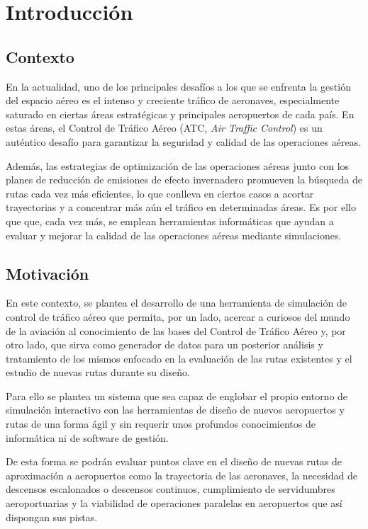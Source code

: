 \chapter{Introducción}
\label{sec:intro}


\section{Contexto}
\label{sec:contexto}

En la actualidad, uno de los principales desafíos a los que se enfrenta la gestión del espacio aéreo es el intenso y creciente tráfico de aeronaves, especialmente saturado en ciertas áreas estratégicas y principales aeropuertos de cada país. En estas áreas, el Control de Tráfico Aéreo (ATC, \textit{Air Traffic Control}) es un auténtico desafío para garantizar la seguridad y calidad de las operaciones aéreas.

Además, las estrategias de optimización de las operaciones aéreas junto con los planes de reducción de emisiones de efecto invernadero promueven la búsqueda de rutas cada vez más eficientes, lo que conlleva en ciertos casos a acortar trayectorias y a concentrar más aún el tráfico en determinadas áreas. Es por ello que que, cada vez más, se emplean herramientas informáticas que ayudan a evaluar y mejorar la calidad de las operaciones aéreas mediante simulaciones.


\section{Motivación}
\label{sec:motivación}

En este contexto, se plantea el desarrollo de una herramienta de simulación de control de tráfico aéreo que permita, por un lado, acercar a curiosos del mundo de la aviación al conocimiento de las bases del Control de Tráfico Aéreo y, por otro lado, que sirva como generador de datos para un posterior análisis y tratamiento de los mismos enfocado en la evaluación de las rutas existentes y el estudio de nuevas rutas durante su diseño.

Para ello se plantea un sistema que sea capaz de englobar el propio entorno de simulación interactivo con las herramientas de diseño de nuevos aeropuertos y rutas de una forma ágil y sin requerir unos profundos conocimientos de informática ni de software de gestión.

De esta forma se podrán evaluar puntos clave en el diseño de nuevas rutas de aproximación a aeropuertos como la trayectoria de las aeronaves, la necesidad de descensos escalonados o descensos continuos, cumplimiento de servidumbres aeroportuarias y la viabilidad de operaciones paralelas en aeropuertos que así dispongan sus pistas.




%
